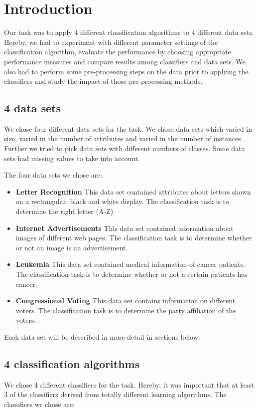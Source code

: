 \documentclass{article}
\begin{document}
\section{Introduction}
Our task was to apply 4 different classification algorithms to 4 different data sets. Hereby, we had to experiment with different parameter settings of the classification algorithm, evaluate the performance by choosing appropriate performance measures and compare results among classifiers and data sets. We also had to perform some pre-processing steps on the data prior to applying the classifiers and study the impact of those pre-processing methods.

\subsection{4 data sets}
We chose four different data sets for the task. We chose data sets which varied in size, varied in the number of attributes and varied in the number of instances. Further we tried to pick data sets with different numbers of classes. Some data sets had missing values to take into account.

The four data sets we chose are:

\begin{itemize}
\item \textbf{Letter Recognition}
This data set contained attributes about letters shown on a rectangular, black and white display. The classification task is to determine the right letter (A-Z)
\item \textbf{Internet Advertisements}
This data set contained information about images of different web pages. The classification task is to determine whether or not an image is an advertisement.
\item \textbf{Leukemia}
This data set contained medical information of cancer patients. The classification task is to determine whether or not a certain patients has cancer.
\item \textbf{Congressional Voting}
This data set contains information on different voters. The classification task is to determine the party affiliation of the voters.
\end{itemize}

Each data set will be described in more detail in sections below.


\subsection{4 classification algorithms}
We chose 4 different classifiers for the task. Hereby, it was important that at least 3 of the classifiers derived from totally different learning algorithms. The classifiers we chose are:
\end{document}
